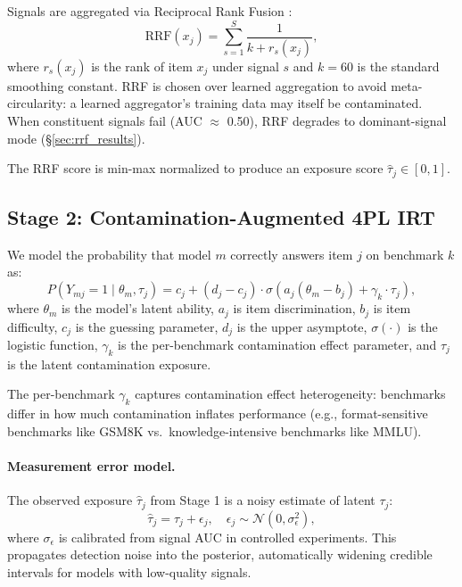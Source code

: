 \documentclass[11pt,a4paper]{article}
\begin{document}
Signals are aggregated via Reciprocal Rank Fusion \citep{cormack2009}:
\begin{equation}
    \text{RRF}(x_j) = \sum_{s=1}^{S} \frac{1}{k + r_s(x_j)},
    \label{eq:rrf}
\end{equation}
where $r_s(x_j)$ is the rank of item $x_j$ under signal $s$ and $k=60$ is the standard smoothing constant. RRF is chosen over learned aggregation to avoid meta-circularity: a learned aggregator's training data may itself be contaminated. When constituent signals fail (AUC $\approx$ 0.50), RRF degrades to dominant-signal mode (\S\ref{sec:rrf_results}).

The RRF score is min-max normalized to produce an exposure score $\hat{\tau}_j \in [0, 1]$.

\subsection{Stage 2: Contamination-Augmented 4PL IRT}
\label{sec:stage2}

We model the probability that model $m$ correctly answers item $j$ on benchmark $k$ as:
\begin{equation}
    P(Y_{mj} = 1 \mid \theta_m, \tau_j) = c_j + (d_j - c_j) \cdot \sigma\!\left(a_j(\theta_m - b_j) + \gamma_k \cdot \tau_j\right),
    \label{eq:4pl_gamma}
\end{equation}
where $\theta_m$ is the model's latent ability, $a_j$ is item discrimination, $b_j$ is item difficulty, $c_j$ is the guessing parameter, $d_j$ is the upper asymptote, $\sigma(\cdot)$ is the logistic function, $\gamma_k$ is the per-benchmark contamination effect parameter, and $\tau_j$ is the latent contamination exposure.

The per-benchmark $\gamma_k$ captures contamination effect heterogeneity: benchmarks differ in how much contamination inflates performance (e.g., format-sensitive benchmarks like GSM8K vs.\ knowledge-intensive benchmarks like MMLU).

\paragraph{Measurement error model.}
The observed exposure $\hat{\tau}_j$ from Stage 1 is a noisy estimate of latent $\tau_j$:
\begin{equation}
    \hat{\tau}_j = \tau_j + \epsilon_j, \quad \epsilon_j \sim \mathcal{N}(0, \sigma_\epsilon^2),
    \label{eq:me}
\end{equation}
where $\sigma_\epsilon$ is calibrated from signal AUC in controlled experiments. This propagates detection noise into the posterior, automatically widening credible intervals for models with low-quality signals.
\end{document}
